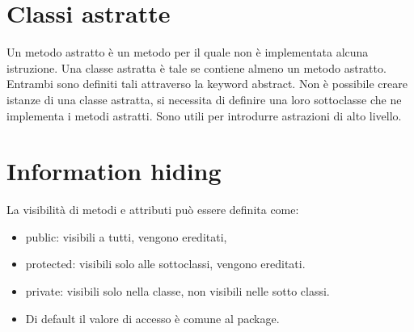 \section{Classi astratte}
Un metodo astratto \`e un metodo per il quale non \`e implementata alcuna istruzione. Una classe astratta \`e tale se contiene almeno un metodo astratto. Entrambi sono 
definiti tali attraverso la keyword abstract. Non \`e possibile creare istanze di una classe astratta, si necessita di definire una loro sottoclasse che ne implementa
i metodi astratti. Sono utili per introdurre astrazioni di alto livello.  
\section{Information hiding}
La visibilit\`a di metodi e attributi pu\`o essere definita come:\begin{itemize}
\item public: visibili a tutti, vengono ereditati, 
\item protected: visibili solo alle sottoclassi, vengono ereditati. 
\item private: visibili solo nella classe, non visibili nelle sotto classi.
\item Di default il valore di accesso \`e comune al package. 
\end{itemize}

